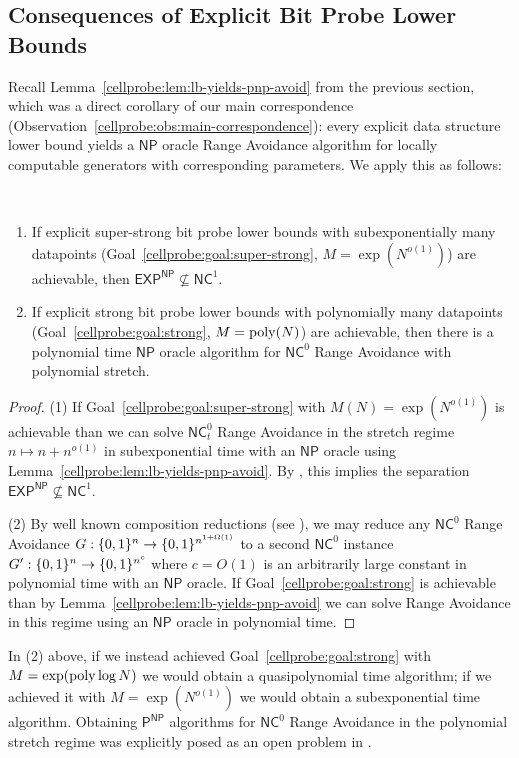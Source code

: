 \subsection{Consequences of Explicit Bit Probe Lower Bounds}\label{cellprobe:subsec:explicit-vs-avoid}
Recall Lemma~\ref{cellprobe:lem:lb-yields-pnp-avoid} from the previous section, which was a direct corollary of our main correspondence (Observation~\ref{cellprobe:obs:main-correspondence}): every explicit data structure lower bound yields a $\mathsf{NP}$ oracle Range Avoidance algorithm for locally computable generators with corresponding parameters.
We apply this as follows:
\begin{theorem*}
~
\begin{enumerate}
    \item If explicit super-strong bit probe lower bounds with subexponentially many datapoints (Goal~\ref{cellprobe:goal:super-strong}, $M = \exp(N^{o(1)})$) are achievable, then $\mathsf{EXP^{NP}} \not\subseteq \mathsf{NC}^1$.
    \item If explicit strong bit probe lower bounds with polynomially many datapoints (Goal~\ref{cellprobe:goal:strong}, $M=\mathrm{poly}(N)$) are achievable, then there is a polynomial time $\mathsf{NP}$ oracle algorithm for $\mathsf{NC}^0$ Range Avoidance with polynomial stretch.
\end{enumerate}
\end{theorem*}
\begin{proof}
(1) If Goal~\ref{cellprobe:goal:super-strong} with $M(N) = \exp(N^{o(1)})$ is achievable than we can solve $\mathsf{NC}^0_t$ Range Avoidance in the stretch regime $n \mapsto n + n^{o(1)}$ in subexponential time with an $\mathsf{NP}$ oracle using Lemma~\ref{cellprobe:lem:lb-yields-pnp-avoid}. By \cite{RSW}, this implies the separation $\mathsf{EXP^{NP}} \not\subseteq \mathsf{NC}^1$.

(2) By well known composition reductions (see \cite{Korten}), we may reduce any $\mathsf{NC}^0$ Range Avoidance $G: \{0,1\}^n \to \{0,1\}^{n^{1+ \Omega(1)}}$ to a second $\mathsf{NC}^0$ instance $G': \{0,1\}^n \to \{0,1\}^{n^c}$ where $c=O(1)$ is an arbitrarily large constant in polynomial time with an $\mathsf{NP}$ oracle. If Goal~\ref{cellprobe:goal:strong} is achievable than by Lemma~\ref{cellprobe:lem:lb-yields-pnp-avoid} we can solve Range Avoidance in this regime using an $\mathsf{NP}$ oracle in polynomial time.
\end{proof}

In (2) above, if we instead achieved Goal~\ref{cellprobe:goal:strong} with $M = \exp(\mathrm{poly} \log N)$ we would obtain a quasipolynomial time algorithm; if we achieved it with $M=\exp(N^{o(1)})$ we would obtain a subexponential time algorithm. Obtaining $\mathsf{P^{NP}}$ algorithms for $\mathsf{NC}^0$ Range Avoidance in the polynomial stretch regime was explicitly posed as an open problem in \cite{RSW}.

